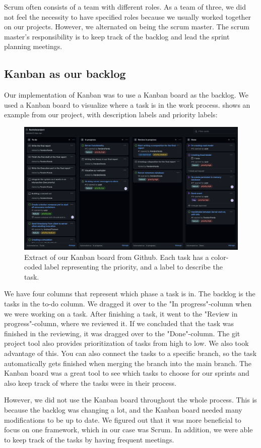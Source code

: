Scrum often consists of a team with different roles. As a team of three, we did not feel the necessity to have specified roles because we usually worked together on our projects. However, we alternated on being the scrum master. The scrum master's responsibility is to keep track of the backlog and lead the sprint planning meetings.

\subsection{Kanban as our backlog}
Our implementation of Kanban was to use a Kanban board as the backlog. We used a Kanban board to visualize where a task is in the work process.  shows an example from our project, with description labels and priority labels:
\begin{figure}[h!]
	\centering
	\includegraphics[width=1\linewidth]{figures/kanban_screenshot}
	\caption[kanban screenshot]{Extract of our Kanban board from Github. Each task has a color-coded label representing the priority, and a label to describe the task.}
	\label{fig:kanbanscreenshot}
\end{figure}

We have four columns that represent which phase a task is in. The backlog is the tasks in the to-do column. We dragged it over to the "In progress"-column when we were working on a task. After finishing a task, it went to the "Review in progress"-column, where we reviewed it. If we concluded that the task was finished in the reviewing, it was dragged over to the "Done"-column. The git project tool also provides prioritization of tasks from high to low. We also took advantage of this. You can also connect the tasks to a specific branch, so the task automatically gets finished when merging the branch into the main branch. The Kanban board was a great tool to see which tasks to choose for our sprints and also keep track of where the tasks were in their process.

However, we did not use the Kanban board throughout the whole process. This is because the backlog was changing a lot, and the Kanban board needed many modifications to be up to date. We figured out that it was more beneficial to focus on one framework, which in our case was Scrum. In addition, we were able to keep track of the tasks by having frequent meetings. 